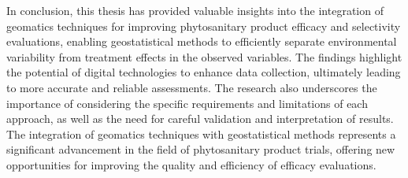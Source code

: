 \documentclass[12pt,a4paper,oneside]{report}
\begin{document}
In conclusion, this thesis has provided valuable insights into the integration of 
geomatics techniques for improving phytosanitary product efficacy and selectivity 
evaluations, enabling geostatistical methods to efficiently separate environmental 
variability from treatment effects in the observed variables.
The findings highlight the potential of digital technologies to enhance data collection, 
ultimately leading to more accurate and reliable assessments.
The research also underscores the importance of 
considering the specific requirements and
limitations of each approach, as well as the need for careful validation and
interpretation of results.
The integration of geomatics techniques with geostatistical methods represents a
significant advancement in the field of phytosanitary product trials, offering
new opportunities for improving the quality and efficiency of efficacy evaluations.
\end{document}
